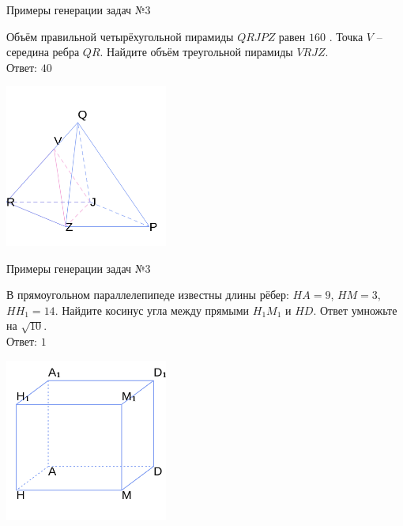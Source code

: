 \documentclass[aspectratio=169,12pt]{beamer}
\begin{document}
\begin{frame}{Примеры генерации задач №3}
	\begin{multicols}{2}
		Объём правильной четырёхугольной пирамиды $QRJPZ$ равен $160$ . Точка $V$  – середина ребра  $QR$. Найдите объём треугольной пирамиды  $VRJZ$.\\

		Ответ: $40$

		\includegraphics[width=0.4\textwidth]{images/1.png}
	\end{multicols}

\end{frame}

\begin{frame}{Примеры генерации задач №3}
	\begin{multicols}{2}
		В прямоугольном параллелепипеде           известны длины рёбер: $HA=9$, $HM=3$, $HH_1=14$. Найдите косинус угла между прямыми $H_1M_1$ и $HD$. Ответ умножьте на  $\sqrt{10}$.\\

		Ответ: $1$

		\includegraphics[width=0.4\textwidth]{images/2.png}
	\end{multicols}

\end{frame}
\end{document}
